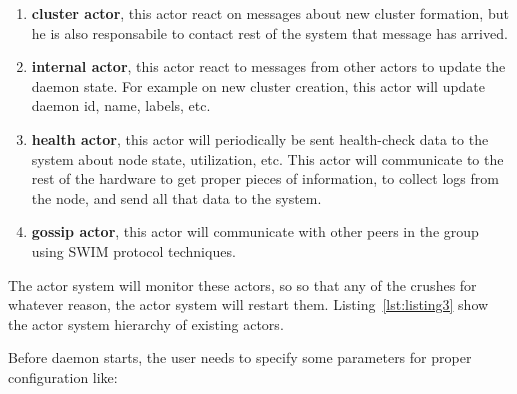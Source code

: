 \begin{enumerate}[start=1,label={(\bfseries \arabic*)}]
	\item \textbf{cluster actor}, this actor react on messages about new cluster formation, but he is also responsabile to contact rest of the system that message has arrived.
	\item \textbf{internal actor}, this actor react to messages from other actors to update the daemon state. For example on new cluster creation, this actor will update daemon id, name, labels, etc.
	\item \textbf{health actor}, this actor will periodically be sent health-check data to the system about node state, utilization, etc. This actor will communicate to the rest of the hardware to get proper pieces of information, to collect logs from the node, and send all that data to the system.
	\item \textbf{gossip actor}, this actor will communicate with other peers in the group using SWIM protocol techniques.
\end{enumerate}

\noindent
The actor system will monitor these actors, so so that any of the crushes for whatever reason, the actor system will restart them. Listing~\ref{lst:listing3} show the actor system hierarchy of existing actors.



\noindent
Before daemon starts, the user needs to specify some parameters for proper configuration like: 

